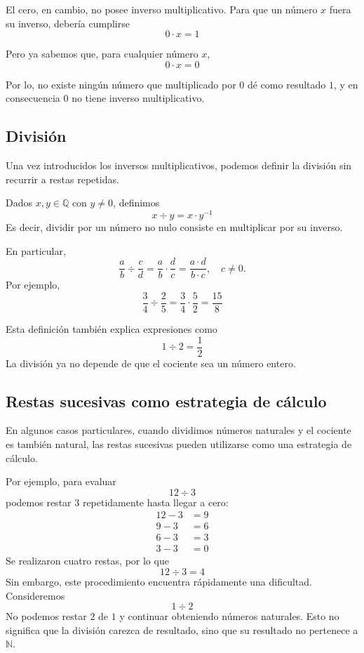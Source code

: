 El cero, en cambio, no posee inverso multiplicativo. Para que un número \(x\) fuera su inverso, debería cumplirse
\[
0\cdot x=1
\]

Pero ya sabemos que, para cualquier número \(x\),
\[
0\cdot x=0
\]

Por lo, no existe ningún número que multiplicado por \(0\) dé como resultado \(1\), y en consecuencia \(0\) no tiene inverso multiplicativo.

\subsection{División}

Una vez introducidos los inversos multiplicativos, podemos definir la división sin recurrir a restas repetidas.

Dados \(x,y\in\mathbb{Q}\) con \(y\ne0\), definimos
\[
\boxed{x\div y=x\cdot y^{-1}}
\]
Es decir, dividir por un número no nulo consiste en multiplicar por su inverso.

En particular,
\[
\frac{a}{b}\div\frac{c}{d}
=
\frac{a}{b}\cdot\frac{d}{c}
=
\frac{a\cdot d}{b\cdot c},
\quad c\ne0.
\]
Por ejemplo,
\[
\frac34\div\frac25
=
\frac34\cdot\frac52
=
\frac{15}{8}
\]

Esta definición también explica expresiones como
\[
1\div2=\frac12
\]
La división ya no depende de que el cociente sea un número entero.

\subsection{Restas sucesivas como estrategia de cálculo}

En algunos casos particulares, cuando dividimos números naturales y el cociente es también natural, las restas sucesivas pueden utilizarse como una estrategia de cálculo.

Por ejemplo, para evaluar
\[
12\div3
\]
podemos restar \(3\) repetidamente hasta llegar a cero:
\begin{align*}
12-3&=9\\
9-3&=6\\
6-3&=3\\
3-3&=0
\end{align*}
Se realizaron cuatro restas, por lo que
\[
12\div3=4
\]
Sin embargo, este procedimiento encuentra rápidamente una dificultad. Consideremos
\[
1\div2
\]
No podemos restar \(2\) de \(1\) y continuar obteniendo números naturales. Esto no significa que la división carezca de resultado, sino que su resultado no pertenece a \(\mathbb N\).


